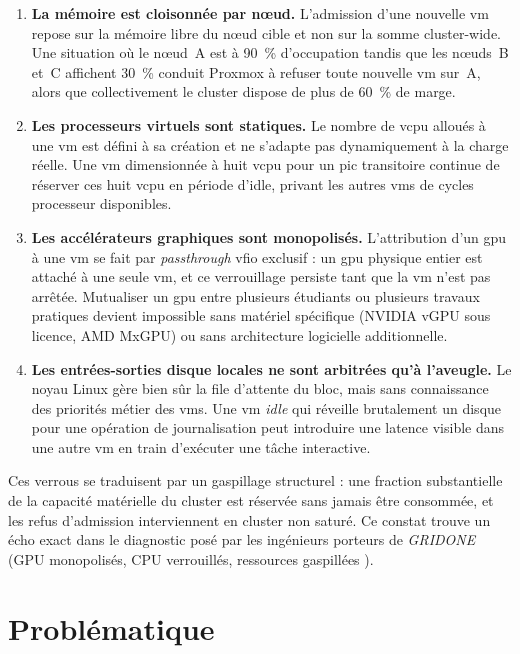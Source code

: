\begin{enumerate}[leftmargin=*]
    \item \textbf{La mémoire est cloisonnée par nœud.} L'admission d'une nouvelle \acrshort{vm} repose sur la mémoire libre du nœud cible et non sur la somme cluster-wide. Une situation où le nœud~A est à 90~\% d'occupation tandis que les nœuds~B et~C affichent 30~\% conduit Proxmox à refuser toute nouvelle \acrshort{vm} sur~A, alors que collectivement le cluster dispose de plus de 60~\% de marge.
    \item \textbf{Les processeurs virtuels sont statiques.} Le nombre de \acrshort{vcpu} alloués à une \acrshort{vm} est défini à sa création et ne s'adapte pas dynamiquement à la charge réelle. Une \acrshort{vm} dimensionnée à huit \acrshort{vcpu} pour un pic transitoire continue de réserver ces huit \acrshort{vcpu} en période d'idle, privant les autres \acrshort{vm}s de cycles processeur disponibles.
    \item \textbf{Les accélérateurs graphiques sont monopolisés.} L'attribution d'un \acrshort{gpu} à une \acrshort{vm} se fait par \emph{passthrough} \acrshort{vfio} exclusif : un \acrshort{gpu} physique entier est attaché à une seule \acrshort{vm}, et ce verrouillage persiste tant que la \acrshort{vm} n'est pas arrêtée. Mutualiser un \acrshort{gpu} entre plusieurs étudiants ou plusieurs travaux pratiques devient impossible sans matériel spécifique (NVIDIA vGPU sous licence, AMD MxGPU) ou sans architecture logicielle additionnelle.
    \item \textbf{Les entrées-sorties disque locales ne sont arbitrées qu'à l'aveugle.} Le noyau Linux gère bien sûr la file d'attente du bloc, mais sans connaissance des priorités métier des \acrshort{vm}s. Une \acrshort{vm} \emph{idle} qui réveille brutalement un disque pour une opération de journalisation peut introduire une latence visible dans une autre \acrshort{vm} en train d'exécuter une tâche interactive.
\end{enumerate}

Ces verrous se traduisent par un gaspillage structurel : une fraction substantielle de la capacité matérielle du cluster est réservée sans jamais être consommée, et les refus d'admission interviennent en cluster non saturé. Ce constat trouve un écho exact dans le diagnostic posé par les ingénieurs porteurs de \emph{GRIDONE} (\og GPU monopolisés, CPU verrouillés, ressources gaspillées \fg{}).

\section*{Problématique}

